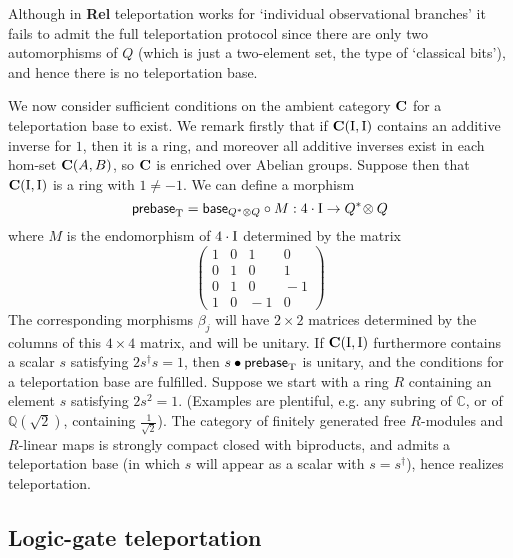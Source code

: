 \documentclass[10pt]{article}
\begin{document}
Although in {\bf Rel} teleportation works for `individual observational branches' it fails to
admit the full teleportation protocol since there are only two
automorphisms of $Q$ (which is just a two-element set, \ie the type of 
`classical bits'), and hence
there is no teleportation base.

We now consider sufficient conditions on the ambient category $\mathbf{C}$
for a teleportation base to exist.
We remark firstly that if ${\bf C}({\rm I},{\rm I})$ contains an
additive inverse for $1$, then it is a ring, and moreover all additive 
inverses exist in each hom-set $\mathbf{C} (A, B)$, so $\mathbf{C}$ is enriched over 
Abelian groups.
Suppose then that  ${\bf C}({\rm I},{\rm I})$ is a ring with $1\not= -1$.
We can define a morphism 
\[
{\sf prebase}_{\rm T}= {\sf base}_{Q^*\otimes Q} \circ M :4\cdot{\rm I}\to
Q^*\!\otimes Q
\]
where $M$ is
the endomorphism of $4 \cdot {\rm I}$ determined by the matrix
\[
\left(
\begin{array}{cccc}
1&0&1&0\\
0&1&0&1\\
0&1&0&\!\!\!\!-\!1\\
1&0&\!\!\!\!-\!1&0
\end{array}
\right)
\]
The corresponding morphisms $\beta_j$ will have $2 \times 2$ matrices determined
by the columns of this $4 \times 4$ matrix, and will be unitary.
If ${\bf C}({\rm I},{\rm I})$ furthermore contains a scalar $s$
satisfying $2s^{\dagger} s = 1$, then $s \bullet {\sf
prebase}_{\rm T}$ is unitary, and the conditions for a teleportation base are fulfilled.
Suppose we start with a ring $R$ containing an element $s$ satisfying
$2s^2 = 1$. (Examples are plentiful, e.g. any  subring of $\mathbb{C}$, or of
$\mathbb{Q}(\sqrt{2})$, containing $\frac{1}{\sqrt{2}}$). The category 
of finitely generated free $R$-modules and $R$-linear maps is strongly 
compact
closed with biproducts, and admits a teleportation base (in which $s$
will appear as a scalar with $s = s^{\dagger}$), hence
realizes teleportation.

\subsection{Logic-gate teleportation}
\end{document}
